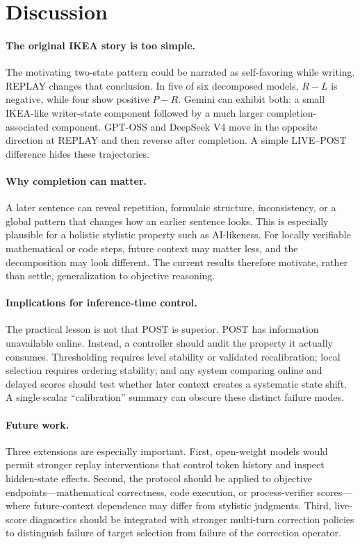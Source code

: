 \section{Discussion}
\paragraph{The original IKEA story is too simple.}
The motivating two-state pattern could be narrated as self-favoring while writing. REPLAY changes that conclusion. In five of six decomposed models, $R-L$ is negative, while four show positive $P-R$. Gemini can exhibit both: a small IKEA-like writer-state component followed by a much larger completion-associated component. GPT-OSS and DeepSeek V4 move in the opposite direction at REPLAY and then reverse after completion. A simple LIVE--POST difference hides these trajectories.

\paragraph{Why completion can matter.}
A later sentence can reveal repetition, formulaic structure, inconsistency, or a global pattern that changes how an earlier sentence looks. This is especially plausible for a holistic stylistic property such as AI-likeness. For locally verifiable mathematical or code steps, future context may matter less, and the decomposition may look different. The current results therefore motivate, rather than settle, generalization to objective reasoning.

\paragraph{Implications for inference-time control.}
The practical lesson is not that POST is superior. POST has information unavailable online. Instead, a controller should audit the property it actually consumes. Thresholding requires level stability or validated recalibration; local selection requires ordering stability; and any system comparing online and delayed scores should test whether later context creates a systematic state shift. A single scalar ``calibration'' summary can obscure these distinct failure modes.

\paragraph{Future work.}
Three extensions are especially important. First, open-weight models would permit stronger replay interventions that control token history and inspect hidden-state effects. Second, the protocol should be applied to objective endpoints---mathematical correctness, code execution, or process-verifier scores---where future-context dependence may differ from stylistic judgments. Third, live-score diagnostics should be integrated with stronger multi-turn correction policies to distinguish failure of target selection from failure of the correction operator.

